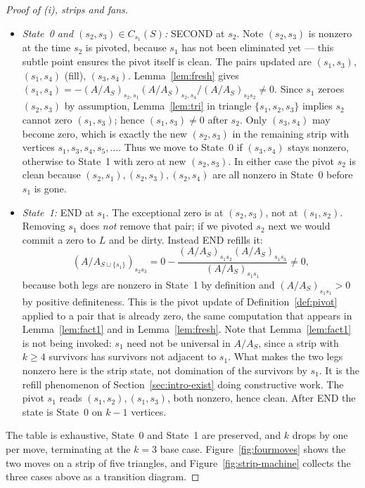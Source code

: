 \documentclass[11pt]{article}
\theoremstyle{plain}
\theoremstyle{definition}
\begin{document}
\begin{aiblock}
\begin{proof}[Proof of (i), strips and fans]
\begin{itemize}
\item \emph{State~0 and $(s_2,s_3)\in C_{s_1}(S)$:} SECOND at $s_2$. Note $(s_2,s_3)$ is nonzero at the time $s_2$ is pivoted, because $s_1$ has not been eliminated yet — this subtle point ensures the pivot itself is clean. The pairs updated are $(s_1,s_3)$, $(s_1,s_4)$ (fill), $(s_3,s_4)$. Lemma~\ref{lem:fresh} gives $(s_1,s_4)=-(A/A_S)_{s_2,s_1}(A/A_S)_{s_2,s_4}/(A/A_S)_{s_2s_2}\neq0$. Since $s_1$ zeroes $(s_2,s_3)$ by assumption, Lemma~\ref{lem:tri} in triangle $\{s_1,s_2,s_3\}$ implies $s_2$ cannot zero $(s_1,s_3)$; hence $(s_1,s_3)\neq0$ after $s_2$. Only $(s_3,s_4)$ may become zero, which is exactly the new $(s_2,s_3)$ in the remaining strip with vertices $s_1,s_3,s_4,s_5,\dots$. Thus we move to State~0 if $(s_3,s_4)$ stays nonzero, otherwise to State~1 with zero at new $(s_2,s_3)$. In either case the pivot $s_2$ is clean because $(s_2,s_1),(s_2,s_3),(s_2,s_4)$ are all nonzero in State~0 before $s_1$ is gone.

\item \emph{State~1:} END at $s_1$. The exceptional zero is at $(s_2,s_3)$, not at $(s_1,s_2)$. Removing $s_1$ does \emph{not} remove that pair; if we pivoted $s_2$ next we would commit a zero to $L$ and be dirty. Instead END refills it:
\[
(A/A_{S\cup\{s_1\}})_{s_2s_3}=0-\frac{(A/A_S)_{s_1s_2}(A/A_S)_{s_1s_3}}{(A/A_S)_{s_1s_1}}\neq0,
\]
because both legs are nonzero in State~1 by definition and $(A/A_S)_{s_1s_1}>0$ by positive
definiteness. This is the pivot update of Definition~\ref{def:pivot} applied to a pair that is
already zero, the same computation that appears in Lemma~\ref{lem:fact1} and in
Lemma~\ref{lem:fresh}. Note that Lemma~\ref{lem:fact1} is not being invoked: $s_1$ need not be
universal in $A/A_S$, since a strip with $k\ge4$ survivors has survivors not adjacent to $s_1$. What
makes the two legs nonzero here is the strip state, not domination of the survivors by $s_1$. It is
the refill phenomenon of Section~\ref{sec:intro-exist} doing constructive work. The pivot $s_1$ reads $(s_1,s_2),(s_1,s_3)$, both nonzero, hence clean. After END the state is State~0 on $k-1$ vertices.
\end{itemize}
The table is exhaustive, State~0 and State~1 are preserved, and $k$ drops by one per move,
terminating at the $k=3$ base case. Figure~\ref{fig:fourmoves} shows the two moves on a strip of five
triangles, and Figure~\ref{fig:strip-machine} collects the three cases above as a transition diagram.


\end{proof}
\end{aiblock}
\end{document}
